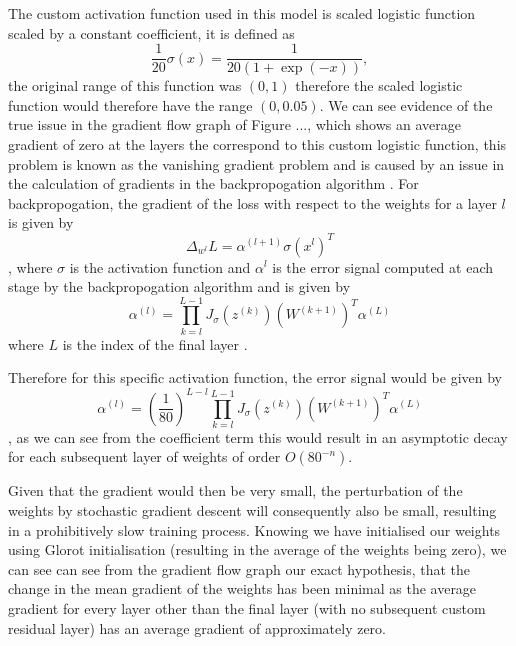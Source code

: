 {{    %




}

    The custom activation function used in this model is scaled logistic function scaled by a constant coefficient, it is defined as $$\frac{1}{20} \sigma(x) = \frac{1}{20(1+\exp(-x))},$$ the original range of this function was $(0,1)$ therefore the scaled logistic function would therefore have the range $(0,0.05)$. We can see evidence of the true issue in the gradient flow graph of Figure ..., which shows an average gradient of zero at the layers the correspond to this custom logistic function, this problem is known as the vanishing gradient problem and is caused by an issue in the calculation of gradients in the backpropogation algorithm \cite{hochreiterGradientFlowRecurrent2001}. For backpropogation, the gradient of the loss with respect to the weights for a layer $l$ is given by $$\Delta_{w^{l}} L = \alpha^{(l+1)} \sigma(x^l)^T$$, where $\sigma$ is the activation function and $\alpha^{l}$ is the error signal computed at each stage by the backpropogation algorithm and is given by $$\alpha^{(l)} = \prod_{k=l}^{L-1} J_{\sigma}(z^{(k)}) (W^{(k+1)})^T \alpha^{(L)}$$ where $L$ is the index of the final layer \cite{petersenMathematicalTheoryDeep2025}.

    Therefore for this specific activation function, the error signal would be given by $$\alpha^{(l)} = \left(\frac{1}{80} \right)^{L-l} \prod_{k=l}^{L-1} J_{\sigma}(z^{(k)}) (W^{(k+1)})^T \alpha^{(L)}$$, as we can see from the coefficient term this would result in an asymptotic decay for each subsequent layer of weights of order $O(80^{-n})$.

    Given that the gradient would then be very small, the perturbation of the weights by stochastic gradient descent will consequently also be small, resulting in a prohibitively slow training process. Knowing we have initialised our weights using Glorot initialisation \cite{glorotUnderstandingDifficultyTraining2010} (resulting in the average of the weights being zero), we can see can see from the gradient flow graph our exact hypothesis, that the change in the mean gradient of the weights has been minimal as the average gradient for every layer other than the final layer (with no subsequent custom residual layer) has an average gradient of approximately zero. 


}
